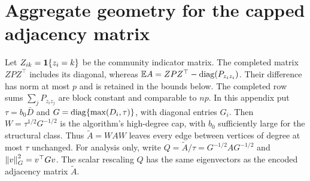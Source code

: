 \section{Aggregate geometry for the capped adjacency matrix}
\label{sec:sparse-extension}

Let $Z_{ik}=\mathbf1\{z_i=k\}$ be the community indicator matrix.
The completed matrix $ZPZ^\top$ includes its diagonal, whereas
$\mathbb E A=ZPZ^\top-\operatorname{diag}(P_{z_i z_i})$. Their difference has norm at
most $p$ and is retained in the bounds below. The completed row
sums $\sum_jP_{z_i z_j}$ are block constant and comparable to $np$.
In this appendix put $\tau=b_0\bar D$ and
$G=\operatorname{diag}\{\max(D_i,\tau)\}$, with diagonal entries $G_i$.
Then $W=\tau^{1/2}G^{-1/2}$ is the algorithm's high-degree cap,
with $b_0$ sufficiently large for the structural class. Thus
$\widetilde A=WAW$ leaves every edge between vertices of degree at most $\tau$
unchanged. For analysis only, write
$Q=\widetilde A/\tau=G^{-1/2}AG^{-1/2}$ and
$\left\lVert v\right\rVert_G^2=v^\top Gv$. The scalar rescaling $Q$ has the same
eigenvectors as the encoded adjacency matrix $\widetilde A$.

